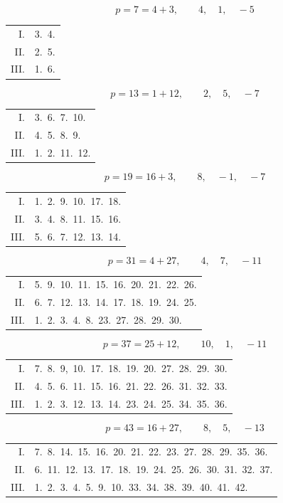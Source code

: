 \clearpage{}
\begin{center}\end{center}


\begingroup\small
\[p = 7 = 4+3, \qquad 4,\quad 1,\quad -5\]
\begin{center}\begin{tabular}{@{}rl@{}}
I. & 3.\ 4.\\
II. & 2.\ 5.\\
III. & 1.\ 6.\end{tabular}\end{center}
\[p = 13 = 1+12, \qquad 2,\quad 5,\quad -7\]
\begin{center}\begin{tabular}{@{}rl@{}}
I. & 3.\ 6.\ 7.\ 10.\\
II. & 4.\ 5.\ 8.\ 9.\\
III. & 1.\ 2.\ 11.\ 12.\end{tabular}\end{center}
\[p = 19 = 16+3, \qquad 8,\quad -1,\quad -7\]
\begin{center}\begin{tabular}{@{}rl@{}}
I. & 1.\ 2.\ 9.\ 10.\ 17.\ 18.\\
II. & 3.\ 4.\ 8.\ 11.\ 15.\ 16.\\
III. & 5.\ 6.\ 7.\ 12.\ 13.\ 14.\end{tabular}\end{center}
\[p = 31 = 4+27, \qquad 4,\quad 7,\quad -11\]
\begin{center}\begin{tabular}{@{}rl@{}}
I. & 5.\ 9.\ 10.\ 11.\ 15.\ 16.\ 20.\ 21.\ 22.\ 26.\\
II. & 6.\ 7.\ 12.\ 13.\ 14.\ 17.\ 18.\ 19.\ 24.\ 25.\\
III. & 1.\ 2.\ 3.\ 4.\ 8.\ 23.\ 27.\ 28.\ 29.\ 30.\end{tabular}\end{center}
\[p = 37 = 25+12, \qquad 10,\quad 1,\quad -11\]
\begin{center}\begin{tabular}{@{}rl@{}}
I. & 7.\ 8.\ 9,\ 10.\ 17.\ 18.\ 19.\ 20.\ 27.\ 28.\ 29.\ 30.\\
II. & 4.\ 5.\ 6.\ 11.\ 15.\ 16.\ 21.\ 22.\ 26.\ 31.\ 32.\ 33.\\
III. & 1.\ 2.\ 3.\ 12.\ 13.\ 14.\ 23.\ 24.\ 25.\ 34.\ 35.\ 36.\end{tabular}\end{center}
\[p = 43 = 16+27, \qquad 8,\quad 5,\quad -13\]
\begin{center}\begin{tabular}{@{}rl@{}}
I. & 7.\ 8.\ 14.\ 15.\ 16.\ 20.\ 21.\ 22.\ 23.\ 27.\ 28.\ 29.\ 35.\ 36.\\
II. & 6.\ 11.\ 12.\ 13.\ 17.\ 18.\ 19.\ 24.\ 25.\ 26.\ 30.\ 31.\ 32.\ 37.\\
III. & 1.\ 2.\ 3.\ 4.\ 5.\ 9.\ 10.\ 33.\ 34.\ 38.\ 39.\ 40.\ 41.\ 42.\end{tabular}\end{center}
